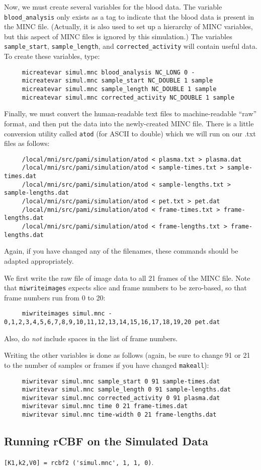 Now, we must create several variables for the blood data.  The
variable \verb|blood_analysis| only exists as a tag to indicate that
the blood data is present in the MINC file.  (Actually, it is also
used to set up a hierarchy of MINC variables, but this aspect of MINC
files is ignored by this simulation.) The variables
\verb|sample_start|, \verb|sample_length|, and
\verb|corrected_activity| will contain useful data.  To create these
variables, type:
\begin{verbatim}
     micreatevar simul.mnc blood_analysis NC_LONG 0 -
     micreatevar simul.mnc sample_start NC_DOUBLE 1 sample
     micreatevar simul.mnc sample_length NC_DOUBLE 1 sample
     micreatevar simul.mnc corrected_activity NC_DOUBLE 1 sample
\end{verbatim}

Finally, we must convert the human-readable text files to
machine-readable ``raw'' format, and then put the data into the
newly-created MINC file.  There is a little conversion utility called
\verb|atod| (for ASCII to double) which we will run on our .txt files
as follows:
\begin{verbatim}
     /local/mni/src/pami/simulation/atod < plasma.txt > plasma.dat
     /local/mni/src/pami/simulation/atod < sample-times.txt > sample-times.dat
     /local/mni/src/pami/simulation/atod < sample-lengths.txt > sample-lengths.dat
     /local/mni/src/pami/simulation/atod < pet.txt > pet.dat
     /local/mni/src/pami/simulation/atod < frame-times.txt > frame-lengths.dat
     /local/mni/src/pami/simulation/atod < frame-lengths.txt > frame-lengths.dat
\end{verbatim}
Again, if you have changed any of the filenames, these commands should
be adapted appropriately.

We first write the raw file of image data to all 21 frames of the MINC
file.  Note that \verb|miwriteimages| expects slice and frame numbers
to be zero-based, so that frame numbers run from 0 to 20:
\begin{verbatim}
     miwriteimages simul.mnc - 0,1,2,3,4,5,6,7,8,9,10,11,12,13,14,15,16,17,18,19,20 pet.dat
\end{verbatim}
Also, do {\em not} include spaces in the list of frame numbers.

Writing the other variables is done as follows (again, be sure to
change 91 or 21 to the number of samples or frames if you have changed
\verb|makeall|):
\begin{verbatim}
     miwritevar simul.mnc sample_start 0 91 sample-times.dat
     miwritevar simul.mnc sample_length 0 91 sample-lengths.dat
     miwritevar simul.mnc corrected_activity 0 91 plasma.dat
     miwritevar simul.mnc time 0 21 frame-times.dat
     miwritevar simul.mnc time-width 0 21 frame-lengths.dat
\end{verbatim}

\subsection{Running rCBF on the Simulated Data}

\verb|[K1,k2,V0] = rcbf2 ('simul.mnc', 1, 1, 0)|.


